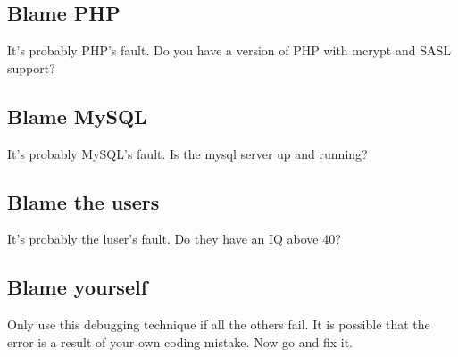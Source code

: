 \documentclass[11pt,letterpaper]{report}
\begin{document}
\subsection{Blame PHP}
It's probably PHP's fault.  Do you have a version of PHP with mcrypt and SASL
support?
\subsection{Blame MySQL}
It's probably MySQL's fault.  Is the mysql server up and running?
\subsection{Blame the users}
It's probably the luser's fault.  Do they have an IQ above 40?
\subsection{Blame yourself}
Only use this debugging technique if all the others fail.
It is possible that the error is a result of your own coding mistake.
Now go and fix it.
\end{document}
